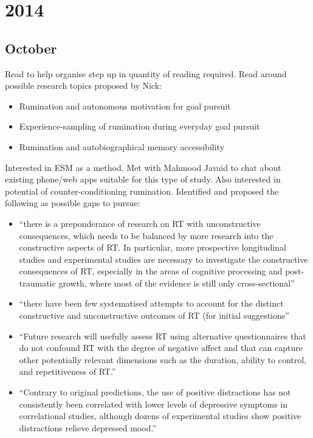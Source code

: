 \documentclass[british]{article}
\title{}
\author{Paul Sharpe}
\date{2015-09-16}
\begin{document}
\section{2014}

\subsection{October}

Read \textcite{shon_how_2012} to help organise step up in quantity of
reading required. Read around possible research topics proposed by Nick:

\begin{itemize}
  \item Rumination and autonomous motivation for goal pursuit \parencite{thomsen_people_2011,watkins_constructive_2008}
  \item Experience-sampling of rumination during everyday goal pursuit
    \parencite{moberly_negative_2010,watkins_habitgoal_2014}
  \item Rumination and autobiographical memory accessibility
    \parencite{conway_construction_2000,schoofs_selfdiscrepancy_2013,debeer_operant_2014}
\end{itemize}

Interested in ESM as a method. Met with Mahmood Javaid to chat about
existing phone/web apps suitable for this type of study. Also interested
in potential of counter-conditioning rumination. Identified and proposed
the following as possible gaps to pursue:

\begin{itemize}
  \item \enquote{there is a preponderance of research on RT with
  unconstructive consequences, which needs to be balanced by more
  research into the constructive aspects of RT. In particular,
  more prospective longitudinal studies and experimental studies
  are necessary to investigate the constructive consequences of RT,
  especially in the areas of cognitive processing and post-traumatic
  growth, where most of the evidence is still only cross-sectional}
  \parencite{watkins_constructive_2008}

  \item \enquote{there have been few systematised attempts to account for
  the distinct constructive and unconstructive outcomes of RT (for initial
  suggestions} \parencite{watkins_constructive_2008}

  \item \enquote{Future research will usefully assess RT using alternative
  questionnaires that do not confound RT with the degree of negative
  affect and that can capture other potentially relevant dimensions
  such as the duration, ability to control, and repetitiveness of RT.}
  \parencite{watkins_constructive_2008}

  \item \enquote{Contrary to original predictions, the use of positive
  distractions has not consistently been correlated with lower levels
  of depressive symptoms in correlational studies, although dozens of
  experimental studies show positive distractions relieve depressed mood.}
  \parencite{nolen-hoeksema_rethinking_2008}
\end{itemize}
\end{document}
